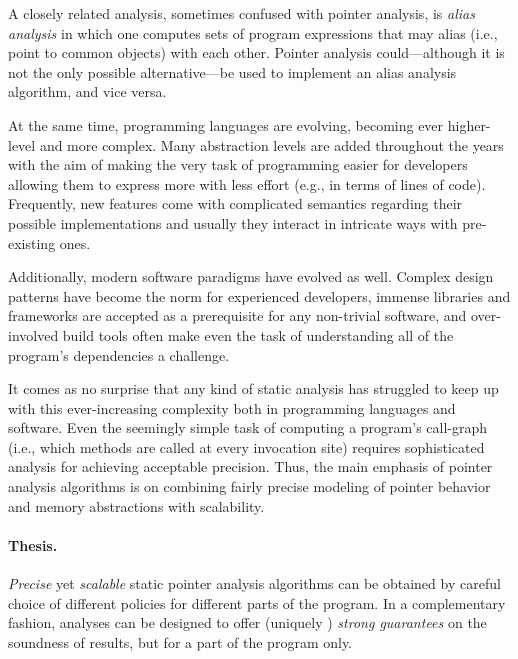 A closely related analysis, sometimes confused with pointer analysis, is \emph{alias analysis} in which one computes sets of program expressions that may alias (i.e., point to common objects) with each other. Pointer analysis could---although it is not the only possible alternative---be used to implement an alias analysis algorithm, and vice versa.

At the same time, programming languages are evolving, becoming ever higher-level and more complex. Many abstraction levels are added throughout the years with the aim of making the very task of programming easier for developers allowing them to express more with less effort (e.g., in terms of lines of code). Frequently, new features come with complicated semantics regarding their possible implementations and usually they interact in intricate ways with pre-existing ones.

Additionally, modern software paradigms have evolved as well. Complex design patterns have become the norm for experienced developers, immense libraries and frameworks are accepted as a prerequisite for any non-trivial software, and over-involved build tools often make even the task of understanding all of the program's dependencies a challenge.

It comes as no surprise that any kind of static analysis has struggled to keep up with this ever-increasing complexity both in programming languages and software. Even the seemingly simple task of computing a program's call-graph (i.e., which methods are called at every invocation site) requires sophisticated analysis for achieving acceptable precision. Thus, the main emphasis of pointer analysis algorithms is on combining fairly precise modeling of pointer behavior and memory abstractions with scalability.

\paragraph*{Thesis.}
\begin{displayquote}
\emph{Precise} yet \emph{scalable} static pointer analysis algorithms can be obtained by careful choice of different policies for different parts of the program. In a complementary fashion, analyses can be designed to offer (uniquely \todo{}) \emph{strong guarantees} on the soundness of results, but for a part of the program only.
\end{displayquote}

